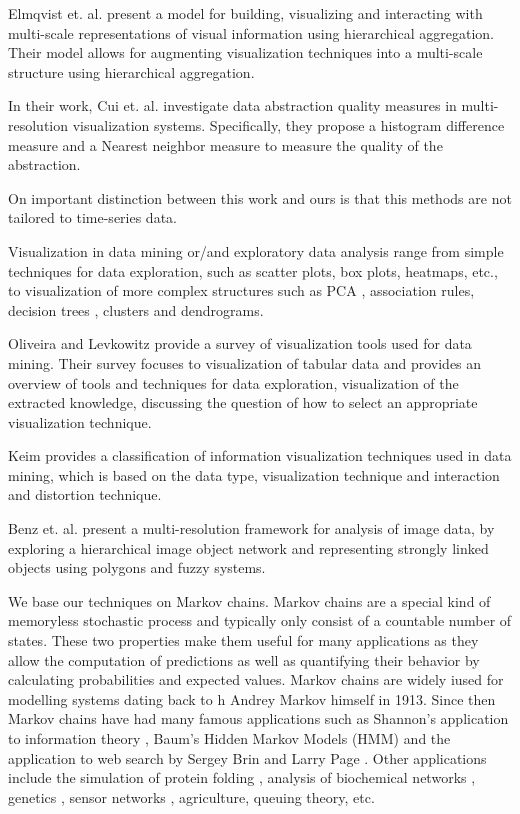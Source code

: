 Elmqvist et. al. \cite{Elmqvist:2010:HAI:1749404.1749525} present a model for building, visualizing and interacting with
multi-scale representations of visual information using hierarchical aggregation. Their model allows for augmenting visualization
techniques into a multi-scale structure using hierarchical aggregation.

In their work, Cui et. al. \cite{4015421} investigate data abstraction quality measures in multi-resolution
visualization systems. Specifically, they propose a histogram difference measure and a Nearest neighbor
measure to measure the quality of the abstraction.

On important distinction between this work and ours is that this methods are not tailored to time-series data.


Visualization in data mining or/and exploratory data analysis range from simple techniques for data exploration, such as
scatter plots, box plots, heatmaps, etc., to visualization of more complex structures such as PCA ,
association rules, decision trees , clusters and dendrograms.

Oliveira and Levkowitz \cite{1207445} provide a survey of visualization tools used for data mining. Their survey focuses
to visualization of tabular data and provides an overview of tools and techniques for data exploration,
visualization of the extracted knowledge, discussing the question of how to select an appropriate visualization
technique.

Keim \cite{981847} provides a classification of information visualization techniques used in data mining, which is based on
the data type, visualization technique and interaction and distortion technique.

Benz et. al. \cite{Benz2004239} present a multi-resolution framework for analysis of image data, by exploring a hierarchical
image object network and representing strongly linked objects using polygons and fuzzy systems.


We base our techniques on  Markov chains. Markov chains are a special kind of memoryless stochastic process and typically only consist of a countable number of states. These two properties make them useful for many applications as they allow the computation of predictions as
well as quantifying their behavior by calculating probabilities and expected values. Markov chains are widely iused for modelling systems dating back to h Andrey Markov himself \cite{markov13} in 1913. Since then
Markov chains have had many famous applications such as Shannon's application to information theory \cite{Shannon:1948},
Baum's Hidden Markov Models (HMM) \cite{baum1970} and the application to web search by Sergey Brin and Larry Page \cite{Lawrence981}.
%
Other applications include the simulation of protein folding \cite{pande-beauchamp-bowman:2010:methods:markov-model-review},
analysis of biochemical networks \cite{Ciocchetta2009145},
genetics \cite{Huelsenbeck2310}, sensor networks \cite{DBLP:journals/corr/AlsheikhHNTL15}, agriculture, queuing theory, etc.

